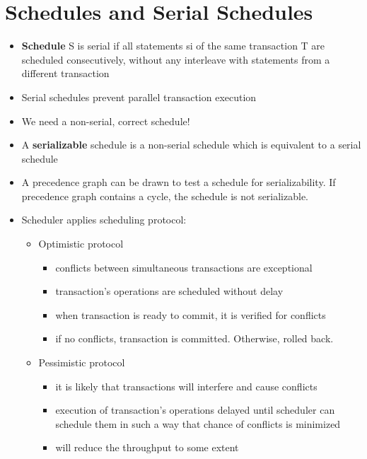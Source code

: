 \documentclass{report}
\begin{document}
    \section{Schedules and Serial Schedules}
    \begin{itemize}
        \item \textbf{Schedule} S is serial if all statements si of the same transaction T are scheduled
        consecutively, without any interleave with statements from a different transaction
        \item Serial schedules prevent parallel transaction execution
        \item We need a non-serial, correct schedule!
        \item A \textbf{serializable} schedule is a non-serial schedule which is equivalent to a serial schedule
        \item A precedence graph can be drawn to test a schedule for serializability. If precedence graph contains a cycle, the schedule is not serializable.
        \item Scheduler applies scheduling protocol:
        \begin{itemize}
            \item Optimistic protocol
            \begin{itemize}
                \item conflicts between simultaneous transactions are exceptional
                \item transaction’s operations are scheduled without delay
                \item when transaction is ready to commit, it is verified for conflicts
                \item if no conflicts, transaction is committed. Otherwise, rolled back.
            \end{itemize}
            \item Pessimistic protocol
            \begin{itemize}
                \item it is likely that transactions will interfere and cause conflicts
                \item execution of transaction’s operations delayed until scheduler can schedule them in such a way that chance of conflicts is minimized
                \item will reduce the throughput to some extent
            \end{itemize}
        \end{itemize}

\end{itemize}
\end{document}
